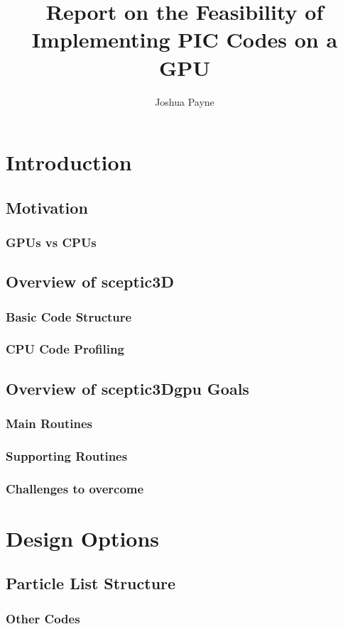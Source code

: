 \documentclass[12pt]{article} %
\title{Report on the Feasibility of Implementing PIC Codes on a GPU}
\author{Joshua Payne}
\begin{document}
\tableofcontents

\section{Introduction}
	\subsection{Motivation}
		\subsubsection{GPUs vs CPUs}

	\subsection{Overview of sceptic3D}
		\subsubsection{Basic Code Structure}
		\subsubsection{CPU Code Profiling}

	\subsection{Overview of sceptic3Dgpu Goals}
		\subsubsection{Main Routines}
		\subsubsection{Supporting Routines}
		\subsubsection{Challenges to overcome}

\section{Design Options}

	\subsection{Particle List Structure}
		\subsubsection{Other Codes}
\end{document}
